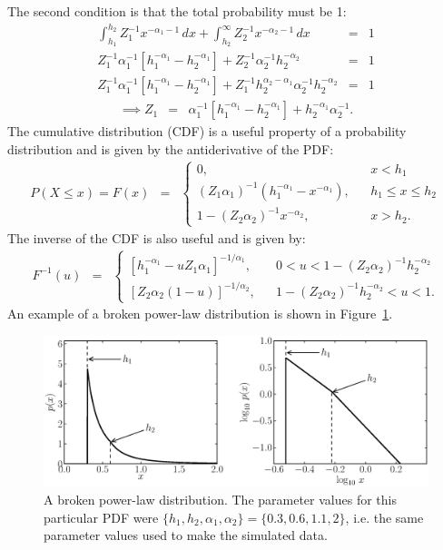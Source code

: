 \documentclass[12pt, preprint]{aastex}
\begin{document}
The second condition is that the total probability must be 1:
\begin{eqnarray}
\int_{h_1}^{h_2} Z_1^{-1} x^{-\alpha_1 - 1} \, dx
+
\int_{h_2}^\infty Z_2^{-1} x^{-\alpha_2 - 1} \, dx
&=& 1 \\
Z_1^{-1}\alpha_1^{-1}\left[h_1^{-\alpha_1} - h_2^{-\alpha_1}\right]
+
Z_2^{-1}\alpha_2^{-1}h_2^{-\alpha_2}
&=& 1 \\
Z_1^{-1}\alpha_1^{-1}\left[h_1^{-\alpha_1} - h_2^{-\alpha_1}\right]
+
Z_1^{-1}h_2^{\alpha_2-\alpha_1}\alpha_2^{-1}h_2^{-\alpha_2}
&=& 1
\end{eqnarray}
\begin{eqnarray}
\implies
Z_1 &=& \alpha_1^{-1}\left[h_1^{-\alpha_1} - h_2^{-\alpha_1}\right]
+
h_2^{-\alpha_1}\alpha_2^{-1}.
\end{eqnarray}
The cumulative distribution (CDF) is a useful property of a probability
distribution and is given by the antiderivative of the PDF:
\begin{eqnarray}
P(X \leq x) = F(x) &=&
\left\{
\begin{array}{lcr}
0, & & x < h_1 \\
(Z_1\alpha_1)^{-1}\left(h_1^{-\alpha_1} - x^{-\alpha_1}\right), & & h_1 \leq x \leq h_2 \\
1 - (Z_2\alpha_2)^{-1}x^{-\alpha_2}, & & x > h_2.
\end{array}
\right.
\end{eqnarray}
The inverse of the CDF is also useful and is given by:
\begin{eqnarray}
F^{-1}(u) &=&
\left\{
\begin{array}{lcr}
\left[h_1^{-\alpha_1} - uZ_1\alpha_1\right]^{-1/\alpha_1}, & & 0 < u < 1 - (Z_2\alpha_2)^{-1}h_2^{-\alpha_2}\\
\left[Z_2\alpha_2(1-u)\right]^{-1/\alpha_2},& & 1 - (Z_2\alpha_2)^{-1}h_2^{-\alpha_2}< u < 1.
\end{array}
\right.
\end{eqnarray}
An example of a broken power-law distribution is shown in Figure~\ref{fig:powerlaw}.
\begin{figure}[ht!]
\begin{center}
\includegraphics[width=\textwidth]{Figures/broken.eps}
\caption{A broken power-law distribution. The parameter values for this
particular PDF were
$\{h_1, h_2, \alpha_1, \alpha_2\} = \{0.3, 0.6, 1.1, 2\}$, i.e. the same
parameter values used to make the simulated data.
\label{fig:powerlaw}}
\end{center}
\end{figure}
\end{document}
